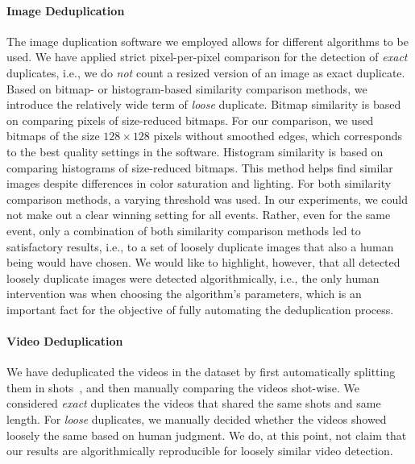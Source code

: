 \documentclass{acm_proc_article-sp}
\let\oldemph\emph
\renewcommand{\emph}[1]{\oldemph{\fontsize{9}{9}\selectfont #1}}
\begin{document}
\paragraph{Image Deduplication}
The image duplication software we employed allows for different algorithms to be used.
We have applied strict pixel-per-pixel comparison for the detection of \emph{exact} duplicates, i.e.,
we do \emph{not} count a resized version of an image as exact duplicate.
Based on bitmap- or histogram-based similarity comparison methods, we introduce the relatively wide term of \emph{loose} duplicate.
Bitmap similarity is based on comparing pixels of size-reduced bitmaps.
For our comparison, we used bitmaps of the size $128 \times 128$ pixels without smoothed edges, which corresponds to the best quality settings in the software.
Histogram similarity is based on comparing histograms of size-reduced bitmaps.
This method helps find similar images despite differences in color saturation and lighting.
For both similarity comparison methods, a varying threshold was used.
In our experiments, we could not make out a clear winning setting for all events.
Rather, even for the same event,
only a combination of both similarity comparison methods led to satisfactory results,
i.e., to a set of loosely duplicate images that also a human being would have chosen.
We would like to highlight, however, that all detected loosely duplicate images were detected algorithmically,
i.e., the only human intervention was when choosing the algorithm's parameters,
which is an important fact for the objective of fully automating the deduplication process.

\paragraph{Video Deduplication}
We have deduplicated the videos in the dataset by first automatically splitting them in shots~\cite{CrowdsourcingEvent}, and then manually comparing the videos shot-wise.
We considered \emph{exact} duplicates the videos that shared the same shots and same length.
For \emph{loose} duplicates, we manually decided whether the videos showed loosely the same based on human judgment.
We do, at this point, not claim that our results are algorithmically reproducible for loosely similar video detection.
\end{document}
